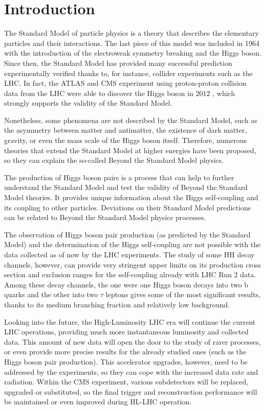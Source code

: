 \documentclass[../main.tex]{subfiles}
\begin{document}
\chapter*{Introduction}

The Standard Model of particle physics is a theory that describes the elementary particles and their interactions. The last piece of this model was included in 1964 with the introduction of the electroweak symmetry breaking and the Higgs boson. Since then, the Standard Model has provided many successful prediction experimentally verified thanks to, for instance, collider experiments such as the LHC. In fact, the ATLAS and CMS experiment using proton-proton collision data from the LHC were able to discover the Higgs boson in 2012 \cite{intro:theo:cms_higgs, intro:theo:atlas_higgs}, which strongly supports the validity of the Standard Model.

Nonetheless, some phenomena are not described by the Standard Model, such as the asymmetry between matter and antimatter, the existence of dark matter, gravity, or even the mass scale of the Higgs boson itself. Therefore, numerous theories that extend the Standard Model at higher energies have been proposed, so they can explain the so-called Beyond the Standard Model physics.

The production of Higgs boson pairs is a process that can help to further understand the Standard Model and test the validity of Beyond the Standard Model theories. It provides unique information about the Higgs self-coupling and its coupling to other particles. Deviations on their Standard Model predictions can be related to Beyond the Standard Model physics processes.

The observation of Higgs boson pair production (as predicted by the Standard Model) and the determination of the Higgs self-coupling are not possible with the data collected as of now by the LHC experiments. The study of some HH decay channels, however, can provide very stringent upper limits on its production cross section and exclusion ranges for the self-coupling already with LHC Run 2 data. Among these decay channels, the one were one Higgs boson decays into two b quarks and the other into two $\tau$ leptons gives some of the most significant results, thanks to its medium branching fraction and relatively low background.

Looking into the future, the High-Luminosity LHC era will continue the current LHC operations, providing much more instantaneous luminosity and collected data. This amount of new data will open the door to the study of rarer processes, or even provide more precise results for the already studied ones (such as the Higgs boson pair production). This accelerator upgrades, however, need to be addressed by the experiments, so they can cope with the increased data rate and radiation. Within the CMS experiment, various subdetectors will be replaced, upgraded or substituted, so the final trigger and reconstruction performance will be maintained or even improved during HL-LHC operation.
\end{document}
